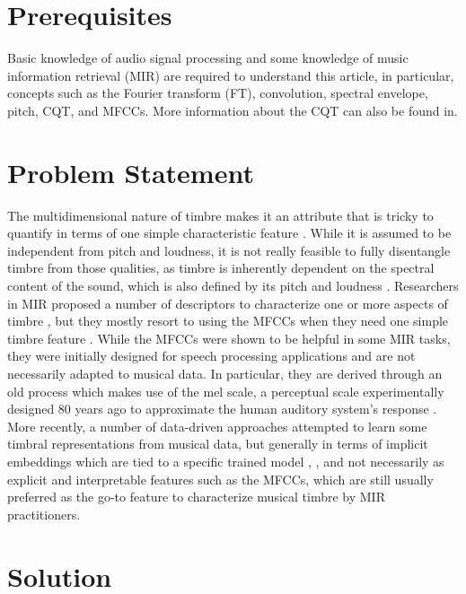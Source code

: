 \documentclass[journal]{IEEEtran}
\begin{document}
\section{Prerequisites}

Basic knowledge of audio signal processing and some knowledge of music information retrieval (MIR) \cite{mueller2007} are required to understand this article, in particular, concepts such as the Fourier transform (FT), convolution, spectral envelope, pitch, CQT, and MFCCs. More information about the CQT can also be found in\cite{brown1991, brown1992}.


\section{Problem Statement}

The multidimensional nature of timbre makes it an attribute that is tricky to quantify in terms of one simple characteristic feature \cite{grey1977}. While it is assumed to be independent from pitch and loudness, it is not really feasible to fully disentangle timbre from those qualities, as timbre is inherently dependent on the spectral content of the sound, which is also defined by its pitch and loudness \cite{moore2004}. Researchers in MIR proposed a number of descriptors to characterize one or more aspects of timbre \cite{peeters2011}, but they mostly resort to using the MFCCs when they need one simple timbre feature \cite{mueller2007}. While the MFCCs were shown to be helpful in some MIR tasks, they were initially designed for speech processing applications \cite{mermelstein1976} and are not necessarily adapted to musical data. In particular, they are derived through an old process which makes use of the mel scale, a perceptual scale experimentally designed 80 years ago to approximate the human auditory system's response \cite{stevens1937}. More recently, a number of data-driven approaches attempted to learn some timbral representations from musical data, but generally in terms of implicit embeddings which are tied to a specific trained model \cite{engel2017}, \cite{pons2017}, and not necessarily as explicit and interpretable features such as the MFCCs, which are still usually preferred as the go-to feature to characterize musical timbre by MIR practitioners.


\section{Solution}
\end{document}
